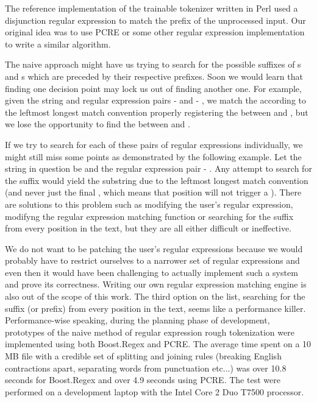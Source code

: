 The reference implementation of the trainable tokenizer written in Perl used a
disjunction regular expression to match the prefix of the unprocessed input.
Our original idea was to use PCRE \cite{web-pcre} or some other regular expression
implementation \cite{web-boost,web-re2} to write a similar algorithm.

The naive approach might have us trying to search for the possible suffixes of
\mayjoin{}s and \maysplit{}s which are preceded by their respective prefixes.
Soon we would learn that finding one decision point may lock us out of finding
another one. For example, given the string  and \maysplit{}
regular expression pairs  -  and  -
, we match the  according to the leftmost longest match
convention properly registering the \maysplit{} between  and
, but we lose the opportunity to find the \maysplit{} between
 and .

If we try to search for each of these pairs of regular expressions
individually, we might still miss some points as demonstrated by the following
example. Let the string in question be  and the \maysplit{}
regular expression pair  - . Any attempt to search
for the suffix  would yield the  substring due to
the leftmost longest match convention (and never just the final ,
which means that position will not trigger a \maysplit). There are solutions to
this problem such as modifying the user's regular expression, modifyng the
regular expression matching function or searching for the suffix from every
position in the text, but they are all either difficult or ineffective.

We do not want to be patching the user's regular expressions because we would
probably have to restrict ourselves to a narrower set of regular expressions
and even then it would have been challenging to actually implement such a system
and prove its correctness. Writing our own regular expression matching engine
is also out of the scope of this work. The third option on the list, searching
for the suffix (or prefix) from every position in the text, seems like a
performance killer. Performance-wise speaking, during the planning phase of
development, prototypes of the naive method of regular expression rough
tokenization were implemented using both Boost.Regex and PCRE. The average
time spent on a 10 MB file with a credible set of splitting and joining rules
(breaking English contractions apart, separating words from punctuation
etc...) was over 10.8 seconds for Boost.Regex and over 4.9 seconds using
PCRE. The test were performed on a development laptop with the Intel Core 2
Duo T7500 processor.

